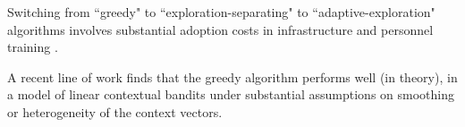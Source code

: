 
Switching from ``greedy" to ``exploration-separating" to ``adaptive-exploration" algorithms involves substantial adoption costs in infrastructure and personnel training \citep{DS-arxiv}.

A recent line of work \citep{kannan2018smoothed,bastani2017exploiting,externalities-colt18}
finds that the greedy algorithm performs well (in theory), in a model of linear contextual bandits under substantial assumptions on smoothing or heterogeneity of the context vectors.


